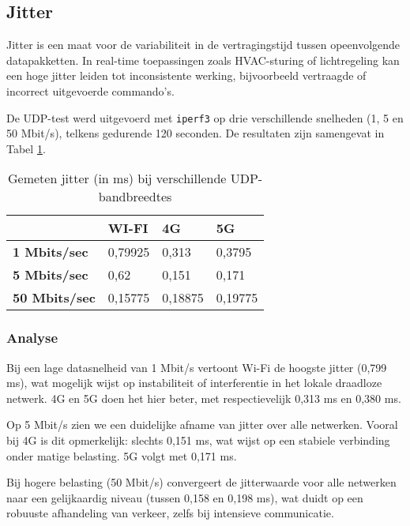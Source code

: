 \subsection{Jitter}
Jitter is een maat voor de variabiliteit in de vertragingstijd tussen opeenvolgende datapakketten. In real-time toepassingen zoals HVAC-sturing of lichtregeling kan een hoge jitter leiden tot inconsistente werking, bijvoorbeeld vertraagde of incorrect uitgevoerde commando’s.

De UDP-test werd uitgevoerd met \texttt{iperf3} op drie verschillende snelheden (1, 5 en 50 Mbit/s), telkens gedurende 120 seconden. De resultaten zijn samengevat in Tabel \ref{tab:jitter}.

\begin{table}[]
    \begin{tabular}{l|l|l|l|}
        \cline{2-4}
        & \textbf{WI-FI} & \textbf{4G} & \textbf{5G} \\ \hline
        \multicolumn{1}{|l|}{\textbf{1 Mbits/sec}}  & 0,79925        & 0,313       & 0,3795      \\ \hline
        \multicolumn{1}{|l|}{\textbf{5 Mbits/sec}}  & 0,62           & 0,151       & 0,171       \\ \hline
        \multicolumn{1}{|l|}{\textbf{50 Mbits/sec}} & 0,15775        & 0,18875     & 0,19775     \\ \hline
    \end{tabular}
    \caption{Gemeten jitter (in ms) bij verschillende UDP-bandbreedtes}
    \label{tab:jitter}
\end{table}

\subsubsection{Analyse}
Bij een lage datasnelheid van 1 Mbit/s vertoont Wi-Fi de hoogste jitter (0,799 ms), wat mogelijk wijst op instabiliteit of interferentie in het lokale draadloze netwerk. 4G en 5G doen het hier beter, met respectievelijk 0,313 ms en 0,380 ms.

Op 5 Mbit/s zien we een duidelijke afname van jitter over alle netwerken. Vooral bij 4G is dit opmerkelijk: slechts 0,151 ms, wat wijst op een stabiele verbinding onder matige belasting. 5G volgt met 0,171 ms.

Bij hogere belasting (50 Mbit/s) convergeert de jitterwaarde voor alle netwerken naar een gelijkaardig niveau (tussen 0,158 en 0,198 ms), wat duidt op een robuuste afhandeling van verkeer, zelfs bij intensieve communicatie.

